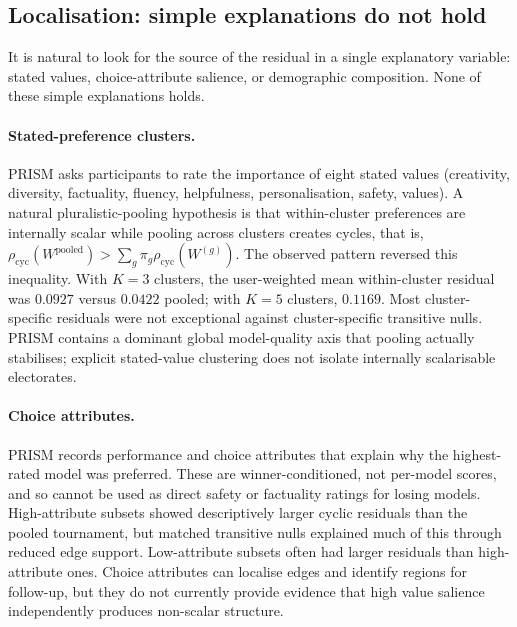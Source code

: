 \documentclass[10pt]{article}
\theoremstyle{definition}
\theoremstyle{remark}
\begin{document}
\subsection{Localisation: simple explanations do not hold}
\label{sec:localisation}

It is natural to look for the source of the residual in a single explanatory variable: stated values, choice-attribute salience, or demographic composition. None of these simple explanations holds.

\paragraph{Stated-preference clusters.} PRISM asks participants to rate the importance of eight stated values (creativity, diversity, factuality, fluency, helpfulness, personalisation, safety, values). A natural pluralistic-pooling hypothesis is that within-cluster preferences are internally scalar while pooling across clusters creates cycles, that is, $\rho_{\mathrm{cyc}}(W^{\mathrm{pooled}})>\sum_g \pi_g\rho_{\mathrm{cyc}}(W^{(g)})$. The observed pattern reversed this inequality. With $K=3$ clusters, the user-weighted mean within-cluster residual was $0.0927$ versus $0.0422$ pooled; with $K=5$ clusters, $0.1169$. Most cluster-specific residuals were not exceptional against cluster-specific transitive nulls. PRISM contains a dominant global model-quality axis that pooling actually stabilises; explicit stated-value clustering does not isolate internally scalarisable electorates.

\paragraph{Choice attributes.} PRISM records performance and choice attributes that explain why the highest-rated model was preferred. These are winner-conditioned, not per-model scores, and so cannot be used as direct safety or factuality ratings for losing models. High-attribute subsets showed descriptively larger cyclic residuals than the pooled tournament, but matched transitive nulls explained much of this through reduced edge support. Low-attribute subsets often had larger residuals than high-attribute ones. Choice attributes can localise edges and identify regions for follow-up, but they do not currently provide evidence that high value salience independently produces non-scalar structure.
\end{document}
